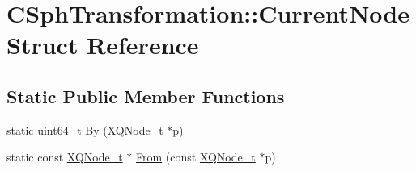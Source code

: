\hypertarget{structCSphTransformation_1_1CurrentNode}{\section{C\-Sph\-Transformation\-:\-:Current\-Node Struct Reference}
\label{structCSphTransformation_1_1CurrentNode}
}
\subsection*{Static Public Member Functions}
\begin{DoxyCompactItemize}
\item 
static \hyperlink{sphinxstd_8h_aaa5d1cd013383c889537491c3cfd9aad}{uint64\-\_\-t} \hyperlink{structCSphTransformation_1_1CurrentNode_a475219efa8e3d1144ebafd409c674ce7}{By} (\hyperlink{structXQNode__t}{X\-Q\-Node\-\_\-t} $\ast$p)
\item 
static const \hyperlink{structXQNode__t}{X\-Q\-Node\-\_\-t} $\ast$ \hyperlink{structCSphTransformation_1_1CurrentNode_a39443a00889d1fcb57d903c1e43e1a00}{From} (const \hyperlink{structXQNode__t}{X\-Q\-Node\-\_\-t} $\ast$p)
\end{DoxyCompactItemize}


